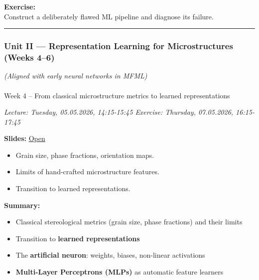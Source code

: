 \documentclass[
]{agujournal2019}
\makeatletter
\let\oldparagraph\paragraph
\renewcommand{\paragraph}{
    \@ifstar
      \xxxParagraphStar
      \xxxParagraphNoStar
  }
\newcommand{\xxxParagraphStar}[1]{\oldparagraph*{#1}\mbox{}}
\newcommand{\xxxParagraphNoStar}[1]{\oldparagraph{#1}\mbox{}}
\providecommand{\tightlist}{%
  \setlength{\itemsep}{0pt}\setlength{\parskip}{0pt}}
\makeatother
\begin{document}
\textbf{Exercise:}\\
Construct a deliberately flawed ML pipeline and diagnose its failure.

\begin{center}\rule{0.5\linewidth}{0.5pt}\end{center}

\subsubsection{Unit II --- Representation Learning for Microstructures
(Weeks
4--6)}\label{unit-ii-representation-learning-for-microstructures-weeks-46}

\emph{(Aligned with early neural networks in MFML)}

\paragraph{Week 4 -- From classical microstructure metrics to learned
representations}\label{week-4-from-classical-microstructure-metrics-to-learned-representations}

\emph{Lecture: Tuesday, 05.05.2026, 14:15-15:45 \textbar{} Exercise:
Thursday, 07.05.2026, 16:15-17:45}

\textbf{Slides:}
\href{https://pelzlab.science/public_presentations/ml_for_characterization_and_processing/unit04_microstructure_representations/01_intro.html}{Open}

\begin{itemize}
\tightlist
\item
  Grain size, phase fractions, orientation maps.
\item
  Limits of hand-crafted microstructure features.
\item
  Transition to learned representations.
\end{itemize}

\textbf{Summary:}

\begin{itemize}
\tightlist
\item
  Classical stereological metrics (grain size, phase fractions) and
  their limits
\item
  Transition to \textbf{learned representations}
\item
  The \textbf{artificial neuron}: weights, biases, non-linear
  activations
\item
  \textbf{Multi-Layer Perceptrons (MLPs)} as automatic feature learners
\end{itemize}
\end{document}
